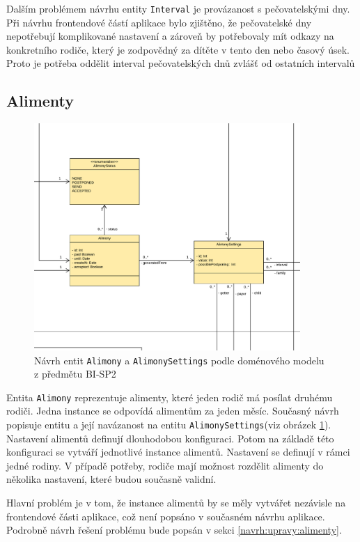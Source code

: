         Dalším problémem návrhu entity \verb|Interval| je provázanost s pečovatelskými dny. Při návrhu frontendové částí aplikace bylo zjištěno, že pečovatelské dny nepotřebují komplikované nastavení a zároveň by potřebovaly mít odkazy na konkretního rodiče, který je zodpovědný za dítěte v tento den nebo časový úsek. Proto je potřeba oddělit interval pečovatelských dnů zvlášť od ostatních intervalů
    
    \subsection{Alimenty}
        \begin{figure}\centering
	        \includegraphics[width=0.9\textwidth]{pdfs/AlimonyDraft1}
	        \caption[Návrh entit \texttt{Alimony} a \texttt{AlimonySettings}]{Návrh entit \texttt{Alimony} a \texttt{AlimonySettings} podle doménového modelu z předmětu BI-SP2}\label{image:aliomny-draft1}
        \end{figure}
        Entita \verb|Alimony| reprezentuje alimenty, které jeden rodič má posílat druhému rodiči. Jedna instance se odpovídá alimentům za jeden měsíc. Současný návrh popisuje entitu a její navázanost na entitu \verb|AlimonySettings|(viz obrázek \ref{image:aliomny-draft1}). Nastavení alimentů definují dlouhodobou konfiguraci. Potom na základě této konfiguraci se vytváří jednotlivé instance alimentů. Nastavení se definují v rámci jedné rodiny. V případě potřeby, rodiče mají možnost rozdělit alimenty do několika nastavení, které budou současně validní.
        
        Hlavní problém je v tom, že instance alimentů by se měly vytvářet nezávisle na frontendové části aplikace, což není popsáno v současném návrhu aplikace. Podrobně návrh řešení problému bude popsán v sekci \ref{navrh:upravy:alimenty}.
        
